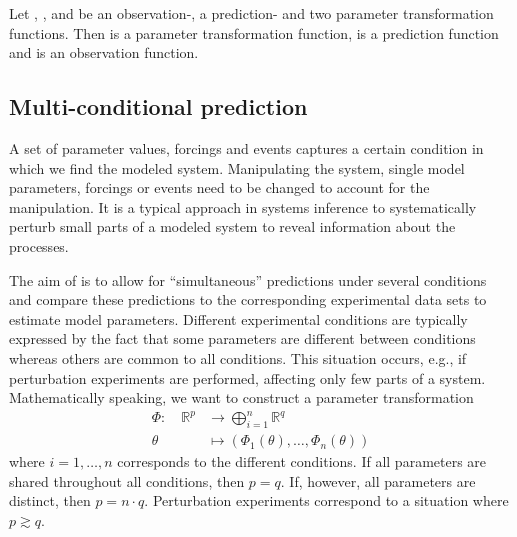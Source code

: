 \documentclass[article]{jss}
\begin{document}
Let , ,  and  be an observation-, a prediction- and two parameter transformation functions. Then  is a parameter transformation function,  is a prediction function and  is an observation function.

\subsection{Multi-conditional prediction}

A set of parameter values, forcings and events captures a certain condition in which we find the modeled system. Manipulating the system, single model parameters, forcings or events need to be changed to account for the manipulation. It is a typical approach in systems inference to systematically perturb small parts of a modeled system to reveal information about the processes.

The aim of  is to allow for ``simultaneous'' predictions under several conditions and compare these predictions to the corresponding experimental data sets to estimate model parameters.
Different experimental conditions are typically expressed by the fact that some parameters are different between conditions whereas others are common to all conditions. This situation occurs, e.g., if perturbation experiments are performed, affecting only few parts of a system.
Mathematically speaking, we want to construct a parameter transformation
\begin{equation}
\begin{aligned}
\Phi:\quad \mathbb R^p & \longrightarrow  \bigoplus_{i = 1}^n \mathbb R^q \\
\theta & \longmapsto  \left(\Phi_1(\theta), \dots, \Phi_n(\theta)\right)
\end{aligned}
\label{eq:partrafo}
\end{equation}
where $i = 1, \dots, n$ corresponds to the different conditions. If all parameters are shared throughout all conditions, then $p = q$. If, however, all parameters are distinct, then $p = n\cdot q$. Perturbation experiments correspond to a situation where $p\gtrsim q$.
\end{document}
